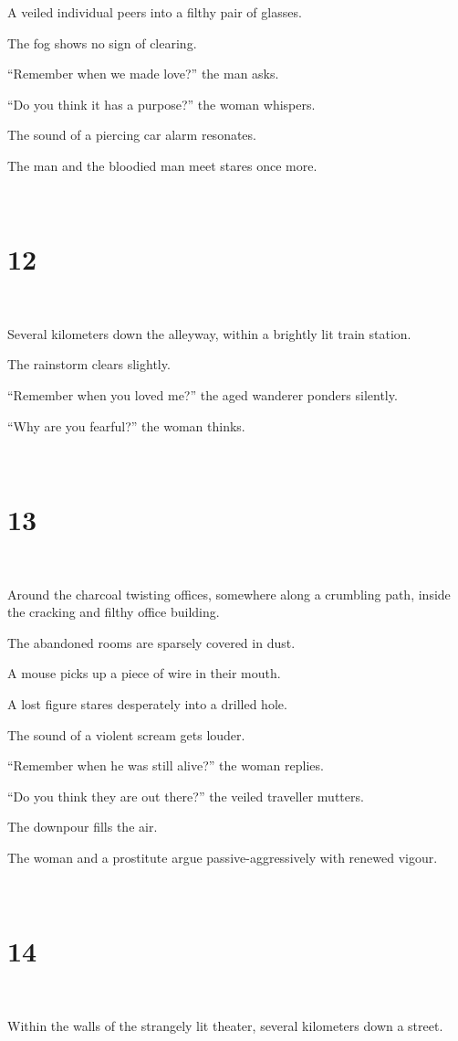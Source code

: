 \documentclass{report}
\begin{document}
A veiled individual peers into a filthy pair of glasses.

The fog shows no sign of clearing.

``Remember when we made love?'' the man asks.

``Do you think it has a purpose?'' the woman whispers.

The sound of a piercing car alarm resonates.

The man and the bloodied man meet stares once more.

~
\chapter*{12}
~

Several kilometers down the alleyway, within a brightly lit train station.

The rainstorm clears slightly.

``Remember when you loved me?'' the aged wanderer ponders silently.

``Why are you fearful?'' the woman thinks.

~
\chapter*{13}
~

Around the charcoal twisting offices, somewhere along a crumbling path, inside the cracking and filthy office building.

The abandoned rooms are sparsely covered in dust.

A mouse picks up a piece of wire in their mouth.

A lost figure stares desperately into a drilled hole.

The sound of a violent scream gets louder.

``Remember when he was still alive?'' the woman replies.

``Do you think they are out there?'' the veiled traveller mutters.

The downpour fills the air.

The woman and a prostitute argue passive-aggressively with renewed vigour.

~
\chapter*{14}
~

Within the walls of the strangely lit theater, several kilometers down a street.
\end{document}
